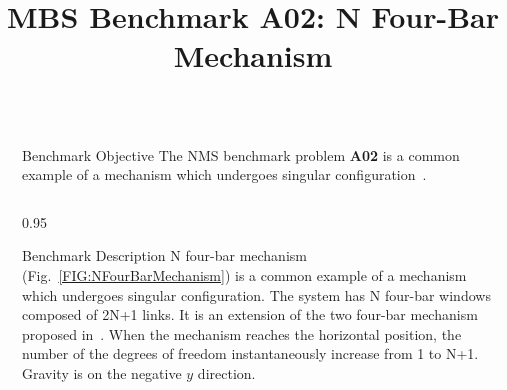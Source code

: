 \documentclass[final]{beamer}
\title{MBS Benchmark A02: N Four-Bar Mechanism} %
\newlength{\sepwid}
\newlength{\onecolwid}
\newlength{\twocolwid}
\begin{document}

\setlength{\belowcaptionskip}{2ex} %
\setlength\belowdisplayshortskip{2ex} %

\begin{frame}[t] %

\begin{columns}[t] %

\begin{column}{\sepwid}\end{column} %

\begin{column}{\twocolwid} %


\begin{alertblock}{Benchmark Objective}
The NMS benchmark problem \textbf{A02} is a common example of a mechanism which undergoes singular configuration~\cite{gonzalez2006benchmarking}.
\end{alertblock}



\begin{columns}[t, totalwidth=\twocolwid]

\begin{column}{0.95\onecolwid}
\begin{block}{Benchmark Description}
N four-bar mechanism (Fig.~\ref{FIG:NFourBarMechanism}) is a common example of a mechanism which undergoes singular configuration.
%
The system has N four-bar windows composed of 2N+1 links. It is an extension of the two four-bar mechanism proposed in~\cite{bayo1994singularity}.
%
When the mechanism reaches the horizontal position, the number of the degrees of freedom instantaneously increase from 1 to N+1.
%
Gravity is on the negative $y$ direction.


\end{block}
\end{column}
\end{columns}
\end{column}
\end{columns}
\end{frame}
\end{document}
